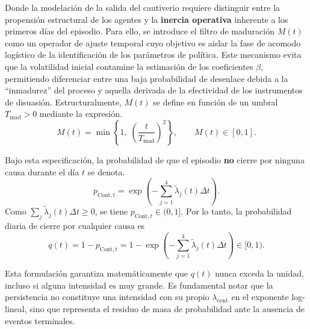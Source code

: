 \documentclass[12pt]{article}
\theoremstyle{definition}
\theoremstyle{remark}
\newcommand{\1}{\mathbf{1}}
\begin{document}
Donde  la modelación de la salida del cautiverio requiere distinguir entre la propensión estructural de los agentes y la \textbf{inercia operativa} inherente a los primeros días del episodio. Para ello, se introduce el filtro de maduración $M(t)$ como un operador de ajuste temporal cuyo objetivo es aislar la fase de acomodo logístico de la identificación de los parámetros de política. Este mecanismo evita que la volatilidad inicial contamine la estimación de los coeficientes $\beta$, permitiendo diferenciar entre una baja probabilidad de desenlace debida a la ``inmadurez'' del proceso y aquella derivada de la efectividad de los instrumentos de disuasión. Estructuralmente, $M(t)$ se define en función de un umbral $T_{\mathrm{mad}} > 0$ mediante la expresión.
\begin{equation}
\label{eq:maturation-filter}
M(t) = \min\left\{ 1,\; \left(\frac{t}{T_{\mathrm{mad}}}\right)^2 \right\}, \qquad M(t)\in[0,1].
\end{equation}


Bajo esta especificación, la probabilidad de que el episodio \textbf{no} cierre por ninguna causa durante el día $t$ se denota.
\begin{equation}
\label{eq:pCont}
p_{\mathrm{Cont},t}=\exp\left(-\sum_{j=1}^{4}\tilde{\lambda}_j(t)\Delta t\right).
\end{equation}
Como $\sum_j\tilde{\lambda}_j(t)\Delta t\ge 0$, se tiene $p_{\mathrm{Cont},t}\in(0,1]$. Por lo tanto, la probabilidad diaria de cierre por cualquier causa es
\begin{equation}
\label{eq:q}
q(t)=1-p_{\mathrm{Cont},t}
=1-\exp\left(-\sum_{j=1}^{4}\tilde{\lambda}_j(t)\Delta t\right)\in[0,1).
\end{equation}

Esta formulación garantiza matemáticamente que $q(t)$ nunca exceda la unidad, incluso si alguna intensidad es muy grande. Es fundamental notar que la persistencia no constituye una intensidad con su propio $\lambda_{\mathrm{cont}}$ en el exponente log-lineal, sino que representa el residuo de masa de probabilidad ante la ausencia de eventos terminales.
\end{document}
